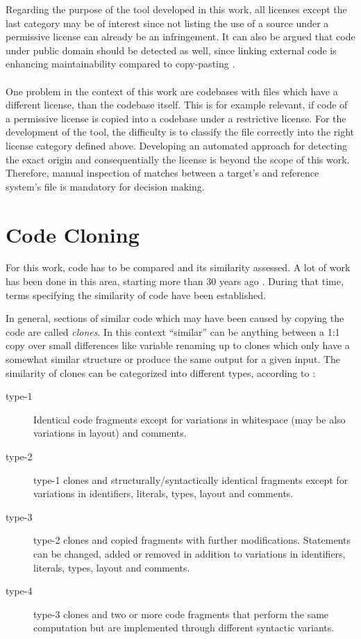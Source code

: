 Regarding the purpose of the tool developed in this work, all licenses except the last category may be of interest since not listing the use of a source under a permissive license can already be an infringement.
It can also be argued that code under public domain should be detected as well, since linking external code is enhancing maintainability compared to copy-pasting \cite{heinemann2012effective}.
\\ \\
\noindent
One problem in the context of this work are codebases with files which have a different license, than the codebase itself.
This is for example relevant, if code of a permissive license is copied into a codebase under a restrictive license.
For the development of the tool, the difficulty is to classify the file correctly into the right license category defined above.
Developing an automated approach for detecting the exact origin and consequentially the license is beyond the scope of this work.
Therefore, manual inspection of matches between a target's and reference system's file is mandatory for decision making.

\section{Code Cloning}\label{section:preliminaries/code_cloning}
For this work, code has to be compared and its similarity assessed.
A lot of work has been done in this area, starting more than 30 years ago \cite{lancaster2004comparison}.
During that time, terms specifying the similarity of code have been established.

In general, sections of similar code which may have been caused by copying the code are called \textit{clones}.
In this context ``similar'' can be anything between a 1:1 copy over small differences like variable renaming up to clones which only have a somewhat similar structure or produce the same output for a given input.
The similarity of clones can be categorized into different types, according to \cite{roy2007survey}:

\begin{description}
	\item[type-1] Identical code fragments except for variations in whitespace (may be also variations in layout) and comments.
	\item[type-2] type-1 clones and structurally/syntactically identical fragments except for variations in identifiers, literals, types, layout and comments.
	\item[type-3] type-2 clones and copied fragments with further modifications. Statements can be changed, added or removed in addition to variations in identifiers, literals, types, layout and comments.
	\item[type-4] type-3 clones and two or more code fragments that perform the same computation but are implemented through different syntactic variants.
\end{description}

